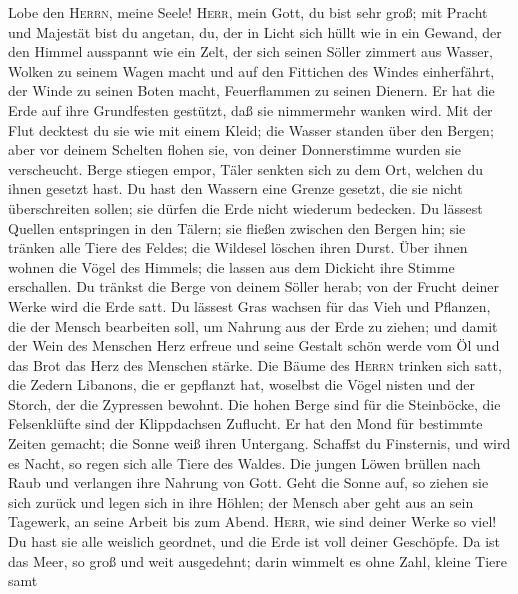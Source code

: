  Lobe den \textsc{Herrn}, meine Seele! \textsc{Herr}, mein
Gott, du bist sehr groß; mit Pracht und Majestät bist du angetan,
 du, der in Licht sich hüllt wie in ein Gewand, der den
Himmel ausspannt wie ein Zelt,  der sich seinen Söller
zimmert aus Wasser, Wolken zu seinem Wagen macht und auf den Fittichen
des Windes einherfährt,  der Winde zu seinen Boten macht,
Feuerflammen zu seinen Dienern.  Er hat die Erde auf ihre
Grundfesten gestützt, daß sie nimmermehr wanken wird.  Mit
der Flut decktest du sie wie mit einem Kleid; die Wasser standen über
den Bergen;  aber vor deinem Schelten flohen sie, von
deiner Donnerstimme wurden sie verscheucht.  Berge stiegen
empor, Täler senkten sich zu dem Ort, welchen du ihnen gesetzt hast.
 Du hast den Wassern eine Grenze gesetzt, die sie nicht
überschreiten sollen; sie dürfen die Erde nicht wiederum bedecken.
 Du lässest Quellen entspringen in den Tälern; sie
fließen zwischen den Bergen hin;  sie tränken alle Tiere
des Feldes; die Wildesel löschen ihren Durst.  Über ihnen
wohnen die Vögel des Himmels; die lassen aus dem Dickicht ihre Stimme
erschallen.  Du tränkst die Berge von deinem Söller
herab; von der Frucht deiner Werke wird die Erde satt. 
Du lässest Gras wachsen für das Vieh und Pflanzen, die der Mensch
bearbeiten soll, um Nahrung aus der Erde zu ziehen;  und
damit der Wein des Menschen Herz erfreue und seine Gestalt schön werde
vom Öl und das Brot das Herz des Menschen stärke.  Die
Bäume des \textsc{Herrn} trinken sich satt, die Zedern Libanons, die er
gepflanzt hat,  woselbst die Vögel nisten und der Storch,
der die Zypressen bewohnt.  Die hohen Berge sind für die
Steinböcke, die Felsenklüfte sind der Klippdachsen Zuflucht.
 Er hat den Mond für bestimmte Zeiten gemacht; die Sonne
weiß ihren Untergang.  Schaffst du Finsternis, und wird
es Nacht, so regen sich alle Tiere des Waldes.  Die
jungen Löwen brüllen nach Raub und verlangen ihre Nahrung von Gott.
 Geht die Sonne auf, so ziehen sie sich zurück und legen
sich in ihre Höhlen;  der Mensch aber geht aus an sein
Tagewerk, an seine Arbeit bis zum Abend.  \textsc{Herr},
wie sind deiner Werke so viel! Du hast sie alle weislich geordnet, und
die Erde ist voll deiner Geschöpfe.  Da ist das Meer, so
groß und weit ausgedehnt; darin wimmelt es ohne Zahl, kleine Tiere samt
